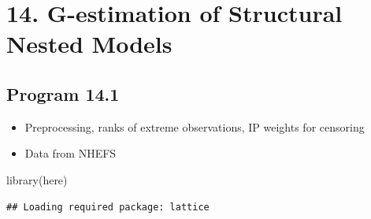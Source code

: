 \documentclass[
  10pt,
]{book}
\newenvironment{Shaded}{\begin{snugshade}}{\end{snugshade}}
\newcommand{\CommentTok}[1]{\textcolor[rgb]{0.56,0.35,0.01}{\textit{#1}}}
\newcommand{\DecValTok}[1]{\textcolor[rgb]{0.00,0.00,0.81}{#1}}
\newcommand{\FunctionTok}[1]{\textcolor[rgb]{0.00,0.00,0.00}{#1}}
\newcommand{\NormalTok}[1]{#1}
\newcommand{\OtherTok}[1]{\textcolor[rgb]{0.56,0.35,0.01}{#1}}
\newcommand{\SpecialCharTok}[1]{\textcolor[rgb]{0.00,0.00,0.00}{#1}}
\newcommand{\StringTok}[1]{\textcolor[rgb]{0.31,0.60,0.02}{#1}}
\providecommand{\tightlist}{%
  \setlength{\itemsep}{0pt}\setlength{\parskip}{0pt}}
\begin{document}
\hypertarget{g-estimation-of-structural-nested-models}{%
\chapter*{14. G-estimation of Structural Nested Models}\label{g-estimation-of-structural-nested-models}}

\hypertarget{program-14.1}{%
\section{Program 14.1}\label{program-14.1}}

\begin{itemize}
\tightlist
\item
  Preprocessing, ranks of extreme observations, IP weights for censoring
\item
  Data from NHEFS
\end{itemize}

\begin{Shaded}
\begin{Highlighting}[]
\FunctionTok{library}\NormalTok{(here)}
\end{Highlighting}
\end{Shaded}

\begin{Shaded}
\end{Shaded}

\begin{verbatim}
## Loading required package: lattice
\end{verbatim}
\end{document}

